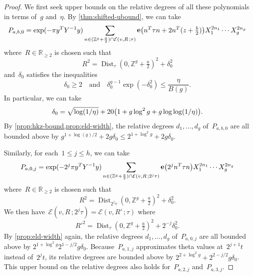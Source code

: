 \documentclass[12pt,oneside]{amsart}
\numberwithin{equation}{section}
\theoremstyle{definition}
\newcommand{\Z}{\mathbb{Z}}
\newcommand{\R}{\mathbb{R}}
\newcommand{\eld}[3]{\ensuremath{\mathcal{E}(#1, #2\,; #3)}}
\DeclareMathOperator{\Dist}{Dist}
\DeclareMathOperator{\e}{\mathbf{e}}
\DeclarePairedDelimiter{\paren}{(}{)}
\begin{document}
\begin{proof}
  We first seek upper bounds on the relative degrees of all these polynomials
  in terms of~$g$ and~$\eta$. By \cref{thm:shifted-ubound}, we can take
  \begin{displaymath}
    P_{a,b,0} = \exp(-\pi y^T Y^{-1} y) \sum_{n\in (\Z^g + \frac a2)\cap \eld{v}{R}{\tau}}
    \e \paren[\big]{n^T\tau n + 2 n^T(z + \tfrac b2)} X_1^{2n_1}\cdots X_g^{2n_g}
  \end{displaymath}
  where~$R\in \R_{\geq 2}$ is chosen such that
  \begin{displaymath}
    R^2 = \Dist_\tau(0, \Z^g + \tfrac{a}{2})^2 + \delta_0^2
  \end{displaymath}
  and~$\delta_0$ satisfies the inequalities
  \begin{displaymath}
    \delta_0\geq 2 \quad\text{and}\quad \delta_0^{g-1} \exp(-\delta_0^2) \leq \frac{\eta}{B(g)}.
  \end{displaymath}
  In particular, we can take
  \begin{equation}
    \label{eq:delta0}
    \delta_0 = \sqrt{\log(1/\eta)} + 20 \paren[\big]{1 + g\log^2 g + g\log\log(1/\eta)}.
  \end{equation}
  By \cref{prop:hkz-bound,prop:eld-width}, the relative degrees
  $d_1,\ldots,d_g$ of~$P_{a,b,0}$ are all bounded above by
  $g^{1+\log(g)/2} + 2g \delta_0 \leq 2^{1+\log^2 g} + 2g\delta_0$.

  Similarly, for each~$1\leq j\leq h$, we can take
  \begin{displaymath}
    P_{a,0,j} = \exp(-2^j \pi y^T Y^{-1} y) \sum_{n\in (\Z^g + \frac a2)\cap \eld{v}{R}{2^j\tau}}
    \e \paren[\big]{2^j n^T\tau n} X_1^{2n_1}\cdots X_g^{2n_g}
  \end{displaymath}
  where~$R\in \R_{\geq 2}$ is chosen such that
  \begin{displaymath}
    R^2 = \Dist_{2^j\tau}(0, \Z^g + \tfrac{a}{2})^2 + \delta_0^2.
  \end{displaymath}
  We then have~$\eld{v}{R}{2^j\tau} = \eld{v}{R'}{\tau}$ where
  \begin{displaymath}
    R'^2 = \Dist_{\tau}(0, \Z^g + \tfrac{a}{2})^2 + 2^{-j}\delta_0^2.
  \end{displaymath}
  By \cref{prop:eld-width} again, the relative degrees $d_1,\ldots,d_g$
  of~$P_{a,0,j}$ are all bounded above by $2^{1+\log^2 g}  2^{1 -
    j/2}g\delta_0$. Because~$P_{a,1,j}$ approximates theta values at~$2^{j+1}t$
  instead of~$2^j t$, its relative degrees are bounded above by
  $2^{2+\log^2 g} + 2^{2 - j/2}g \delta_0$. This upper bound on the relative degrees also
  holds for~$P_{a,2,j}$ and~$P_{a,3,j}$.


\end{proof}
\end{document}
